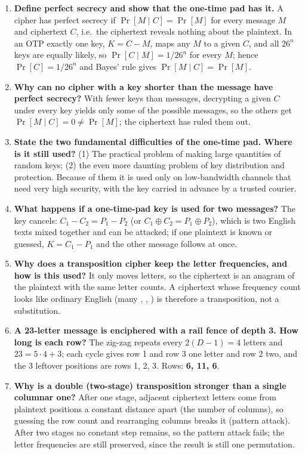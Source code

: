 \begin{enumerate}[leftmargin=1.6em,itemsep=3pt]
  \item \textbf{Define perfect secrecy and show that the one-time pad has it.} A cipher has perfect secrecy if $\Pr[M \mid C] = \Pr[M]$ for every message $M$ and ciphertext $C$, i.e.\ the ciphertext reveals nothing about the plaintext. In an OTP exactly one key, $K = C - M$, maps any $M$ to a given $C$, and all $26^n$ keys are equally likely, so $\Pr[C \mid M] = 1/26^n$ for every $M$; hence $\Pr[C] = 1/26^n$ and Bayes' rule gives $\Pr[M \mid C] = \Pr[M]$.
  \item \textbf{Why can no cipher with a key shorter than the message have perfect secrecy?} With fewer keys than messages, decrypting a given $C$ under every key yields only some of the possible messages, so the others get $\Pr[M \mid C] = 0 \ne \Pr[M]$; the ciphertext has ruled them out.
  \item \textbf{State the two fundamental difficulties of the one-time pad. Where is it still used?} (1) The practical problem of making large quantities of random keys; (2) the even more daunting problem of key distribution and protection. Because of them it is used only on low-bandwidth channels that need very high security, with the key carried in advance by a trusted courier.
  \item \textbf{What happens if a one-time-pad key is used for two messages?} The key cancels: $C_1 - C_2 = P_1 - P_2$ (or $C_1 \oplus C_2 = P_1 \oplus P_2$), which is two English texts mixed together and can be attacked; if one plaintext is known or guessed, $K = C_1 - P_1$ and the other message follows at once.
  \item \textbf{Why does a transposition cipher keep the letter frequencies, and how is this used?} It only moves letters, so the ciphertext is an anagram of the plaintext with the same letter counts. A ciphertext whose frequency count looks like ordinary English (many , , ) is therefore a transposition, not a substitution.
  \item \textbf{A 23-letter message is enciphered with a rail fence of depth 3. How long is each row?} The zig-zag repeats every $2(D-1) = 4$ letters and $23 = 5 \cdot 4 + 3$; each cycle gives row 1 and row 3 one letter and row 2 two, and the 3 leftover positions are rows 1, 2, 3. Rows: \textbf{6, 11, 6}.
  \item \textbf{Why is a double (two-stage) transposition stronger than a single columnar one?} After one stage, adjacent ciphertext letters come from plaintext positions a constant distance apart (the number of columns), so guessing the row count and rearranging columns breaks it (pattern attack). After two stages no constant step remains, so the pattern attack fails; the letter frequencies are still preserved, since the result is still one permutation.

\end{enumerate}

